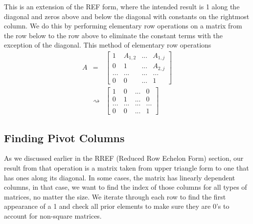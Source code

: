\documentclass[12pt, a4paper]{article}
\begin{document}
This is an extension of the REF form, where the intended result is 1 along the diagonal and zeros above and below the diagonal with constants on the rightmost column.
We do this by performing elementary row operations on a matrix from the row below to the row above to eliminate the constant terms with the exception of the diagonal. 
This method of elementary row operations
\begin{eqnarray*}
    A & = & \begin{bmatrix}
        1  & A_{1,2} & ... & A_{1,j}\\
        0 & 1 & ... & A_{2,j}\\
        ... & ... & ... & ... \\
        0 & 0 & ... & 1
    \end{bmatrix} \\     
    & \rightsquigarrow & \begin{bmatrix}
        1  & 0 & ... & 0\\
        0 & 1 & ... & 0\\
        ... & ... & ... & ... \\
        0 & 0 & ... & 1
    \end{bmatrix}
\end{eqnarray*}

\subsection{Finding Pivot Columns}

As we discussed earlier in the RREF (Reduced Row Echelon Form) section, our result from that operation
is a matrix taken from upper triangle form to one that has ones along its diagonal. In some cases, the matrix has linearly dependent columns,
in that case, we want to find the index of those columns for all types of matrices, no matter the size. We iterate through each row to find the first appearance of a 1
and check all prior elements to make sure they are 0's to account for non-square matrices.
\end{document}
